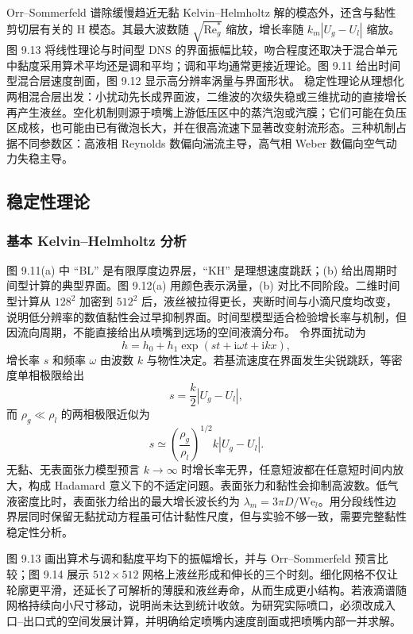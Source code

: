 \documentclass[11pt,a4paper,openany,fontset=none]{ctexbook}
\begin{document}
Orr--Sommerfeld 谱除缓慢趋近无黏 Kelvin--Helmholtz 解的模态外，还含与黏性剪切层有关的 H 模态。其最大波数随 $\sqrt{\mathrm{Re}_g^*}$ 缩放，增长率随 $k_m|U_g-U_l|$ 缩放。图 9.13 将线性理论与时间型 DNS 的界面振幅比较，吻合程度还取决于混合单元中黏度采用算术平均还是调和平均；调和平均通常更接近理论。图 9.11 给出时间型混合层速度剖面，图 9.12 显示高分辨率涡量与界面形状。
稳定性理论从理想化两相混合层出发：小扰动先长成界面波，二维波的次级失稳或三维扰动的直接增长再产生液丝。空化机制则源于喷嘴上游低压区中的蒸汽泡或汽膜；它们可能在负压区成核，也可能由已有微泡长大，并在很高流速下显著改变射流形态。三种机制占据不同参数区：高液相 Reynolds 数偏向湍流主导，高气相 Weber 数偏向空气动力失稳主导。

\subsection{稳定性理论}

\subsubsection{基本 Kelvin--Helmholtz 分析}

图 9.11(a) 中 ``BL'' 是有限厚度边界层，``KH'' 是理想速度跳跃；(b) 给出周期时间型计算的典型界面。图 9.12(a) 用颜色表示涡量，(b) 对比不同阶段。二维时间型计算从 $128^2$ 加密到 $512^2$ 后，液丝被拉得更长，夹断时间与小滴尺度均改变，说明低分辨率的数值黏性会过早抑制界面。时间型模型适合检验增长率与机制，但因流向周期，不能直接给出从喷嘴到远场的空间液滴分布。
令界面扰动为
\begin{equation}
 h=h_0+h_1\exp(st+\mathrm i\omega t+\mathrm ikx),
 \tag{9.10}
\end{equation}
增长率 $s$ 和频率 $\omega$ 由波数 $k$ 与物性决定。若基流速度在界面发生尖锐跳跃，等密度单相极限给出
\begin{equation}
 s=\frac{k}{2}|U_g-U_l|,
 \tag{9.11}
\end{equation}
而 $\rho_g\ll\rho_l$ 的两相极限近似为
\begin{equation}
 s\simeq\left(\frac{\rho_g}{\rho_l}\right)^{1/2}
 k|U_g-U_l|.
 \tag{9.12}
\end{equation}
无黏、无表面张力模型预言 $k\to\infty$ 时增长率无界，任意短波都在任意短时间内放大，构成 Hadamard 意义下的不适定问题。表面张力和黏性会抑制高波数。低气液密度比时，表面张力给出的最大增长波长约为
$\lambda_m=3\pi D/\mathrm{We}_l$。用分段线性边界层同时保留无黏扰动方程虽可估计黏性尺度，但与实验不够一致，需要完整黏性稳定性分析。

图 9.13 画出算术与调和黏度平均下的振幅增长，并与 Orr--Sommerfeld 预言比较；图 9.14 展示 $512\times512$ 网格上液丝形成和伸长的三个时刻。细化网格不仅让轮廓更平滑，还延长了可解析的薄膜和液丝寿命，从而生成更小结构。若液滴谱随网格持续向小尺寸移动，说明尚未达到统计收敛。为研究实际喷口，必须改成入口--出口式的空间发展计算，并明确给定喷嘴内速度剖面或把喷嘴内部一并求解。
\end{document}
